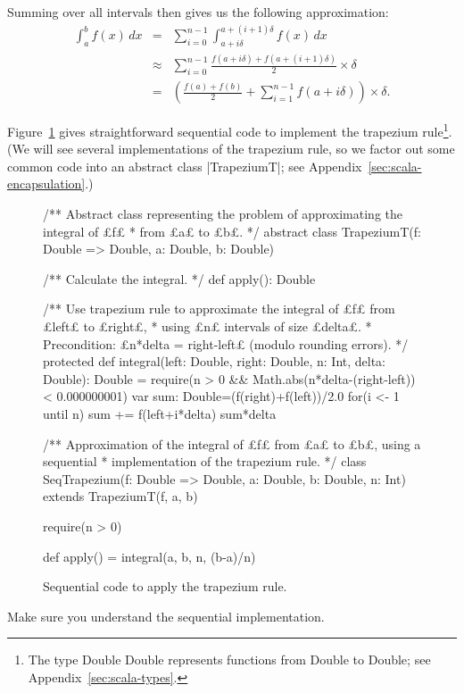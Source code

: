 Summing over all intervals then gives us the following approximation:
\begin{eqnarray*}
\int_a^b f(x) \, dx  & = & 
  \sum_{i = 0}^{n-1} \int_{a+i\delta}^{a+(i+1)\delta} f(x)\, dx \\
& \approx & 
  \sum_{i=0}^{n-1} \frac{f(a+i\delta) + f(a+(i+1)\delta)}{2} \times \delta \\
& = &
  \left( \frac{f(a)+f(b)}{2} + \sum_{i=1}^{n-1} f(a+i\delta) \right) \times \delta.
\end{eqnarray*}

Figure~\ref{fig:trapezium-sequential} gives straightforward sequential code to
implement the trapezium rule\footnote{The type {\scalashape
Double \protect\SCALA{=>} Double} represents functions from {\scalashape
Double} to {\scalashape Double}; see Appendix~\ref{sec:scala-types}.}.  (We
will see several implementations of the trapezium rule, so we factor out some
common code into an abstract class |TrapeziumT|; see
Appendix~\ref{sec:scala-encapsulation}.)


\begin{figure}
\begin{scala}
/** Abstract class representing the problem of approximating the integral of £f£
  * from £a£ to £b£. */
abstract class TrapeziumT(f: Double => Double, a: Double, b: Double){
  /** Calculate the integral. */
  def apply(): Double

  /** Use trapezium rule to approximate the integral of £f£ from £left£ to £right£, 
    * using £n£ intervals of size £delta£. 
    * Precondition: £n*delta = right-left£ (modulo rounding errors). */
  protected 
  def integral(left: Double, right: Double, n: Int, delta: Double): Double = {
    require(n > 0 && Math.abs(n*delta-(right-left)) < 0.000000001) 
    var sum: Double=(f(right)+f(left))/2.0
    for(i <- 1 until n) sum += f(left+i*delta)
    sum*delta
  }
}

/** Approximation of the integral of £f£ from £a£ to £b£, using a sequential 
  * implementation of the trapezium rule. */
class SeqTrapezium(f: Double => Double, a: Double, b: Double, n: Int)
    extends TrapeziumT(f, a, b){
  require(n > 0)

  def apply() = integral(a, b, n, (b-a)/n)
}
\end{scala}
\caption{Sequential code to apply the trapezium rule.}
\label{fig:trapezium-sequential}
\end{figure}

\begin{instruction}
Make sure you understand the sequential implementation.
\end{instruction}


